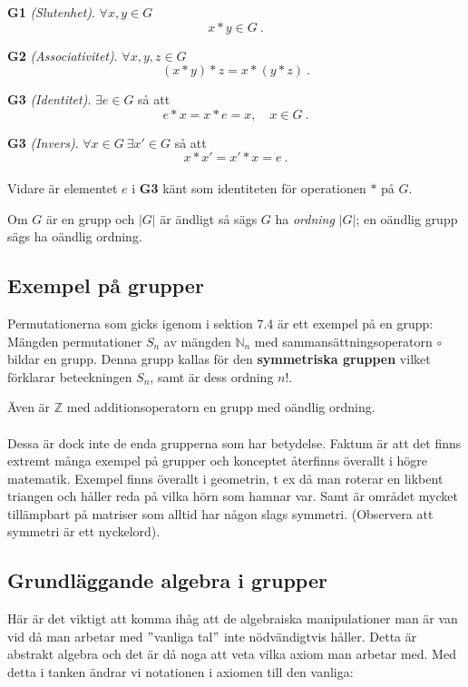 \documentclass{article}
\begin{document}
\textbf{G1} \textit{(Slutenhet)}.\hspace{0.5 cm} $\forall x,y\in G$
$$
x*y\in G \ .
$$

\textbf{G2} \textit{(Associativitet)}.\hspace{0.5 cm} $\forall x,y,z\in G$
$$
(x*y)*z=x*(y*z) \ .
$$

\textbf{G3} \textit{(Identitet)}.\hspace{0.5 cm} $\exists e\in G$ så att
$$
e*x=x*e=x, \quad x\in G \ .
$$

\textbf{G3} \textit{(Invers)}.\hspace{0.5 cm} $\forall x\in G \ \exists x'\in G$ så att
$$
x*x'=x'*x=e \ .
$$\\ 
Vidare är elementet $e$ i \textbf{G3} känt som identiteten för operationen $*$ på $G$.

Om $G$ är en grupp och $|G|$ är ändligt så sägs $G$ ha \textit{ordning} $|G|$; en oändlig grupp sägs ha oändlig ordning.

\subsection{Exempel på grupper}
Permutationerna som gicks igenom i sektion 7.4 är ett exempel på en grupp: Mängden permutationer $S_n$ av mängden $\mathbb{N}_n$ med sammansättningsoperatorn $\circ$ bildar en grupp. Denna grupp kallas för den \textbf{symmetriska gruppen} vilket förklarar beteckningen $S_n$, samt är dess ordning $n!$.

Även är $\mathbb{Z}$ med additionsoperatorn en grupp med oändlig ordning.\\ \\ 
Dessa är dock inte de enda grupperna som har betydelse. Faktum är att det finns extremt många exempel på grupper och konceptet återfinns överallt i högre matematik. Exempel finns överallt i geometrin, t ex då man roterar en likbent triangen och håller reda på vilka hörn som hamnar var. Samt är området mycket tillämpbart på matriser som alltid har någon slags symmetri. (Observera att symmetri är ett nyckelord).

\subsection{Grundläggande algebra i grupper}
Här är det viktigt att komma ihåg att de algebraiska manipulationer man är van vid då man arbetar med $"$vanliga tal$"$ inte nödvändigtvis håller. Detta är abstrakt algebra och det är då noga att veta vilka axiom man arbetar med. Med detta i tanken ändrar vi notationen i axiomen till den vanliga:\\ 
\end{document}
